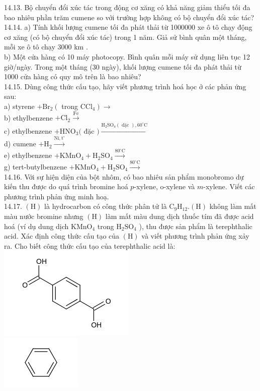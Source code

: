 \documentclass[10pt]{article}
\begin{document}
14.13. Bộ chuyển đổi xúc tác trong động cơ xăng có khả năng giảm thiểu tối đa bao nhiêu phần trăm cumene so với trường hợp không có bộ chuyển đổi xúc tác?\\
14.14. a) Tính khối lượng cumene tối đa phát thải từ 1000000 xe ô tô chạy động cơ xăng (có bộ chuyển đổi xúc tác) trong 1 năm. Giả sử bình quân một tháng, mỗi xe ô tô chạy 3000 km .\\
b) Một cửa hàng có 10 máy photocopy. Bình quân mỗi máy sử dụng liên tục 12 giờ/ngày. Trong một tháng (30 ngày), khối lượng cumene tối đa phát thải từ 1000 cửa hàng có quy mô trên là bao nhiêu?\\
14.15. Dùng công thức cấu tạo, hãy viết phương trình hoá học ở các phản ứng sau:\\
a) styrene $+\mathrm{Br}_{2}\left(\right.$ trong $\left.\mathrm{CCl}_{4}\right) \longrightarrow$\\
b) ethylbenzene $+\mathrm{Cl}_{2} \xrightarrow{\mathrm{Fe}}$\\
c) ethylbenzene $+\mathrm{HNO}_{3}($ đặc $) \xrightarrow{\mathrm{H}_{2} \mathrm{SO}_{4}(\text { dặc }), 60^{\circ} \mathrm{C}}$\\
d) cumene $+\mathrm{H}_{2} \xrightarrow{\mathrm{Ni}, \mathrm{t}^{\circ}}$\\
e) ethylbenzene $+\mathrm{KMnO}_{4}+\mathrm{H}_{2} \mathrm{SO}_{4} \xrightarrow{80^{\circ} \mathrm{C}}$\\
g) tert-butylbenzene $+\mathrm{KMnO}_{4}+\mathrm{H}_{2} \mathrm{SO}_{4} \xrightarrow{80^{\circ} \mathrm{C}}$\\
14.16. Với sự hiện diện của bột nhôm, có bao nhiêu sản phẩm monobromo dự kiến thu được do quá trình bromine hoá $p$-xylene, o-xylene và $m$-xylene. Viết các phương trình phản ứng minh hoạ.\\
14.17. $(\mathrm{H})$ là hydrocarbon có công thức phân tử là $\mathrm{C}_{9} \mathrm{H}_{12} .(\mathrm{H})$ không làm mất màu nước bromine nhưng $(\mathrm{H})$ làm mất màu dung dịch thuốc tím đã được acid hoá (ví dụ dung dịch $\mathrm{KMnO}_{4}$ trong $\mathrm{H}_{2} \mathrm{SO}_{4}$ ), thu được sản phẩm là terephthalic acid. Xác định công thức cấu tạo của $(\mathrm{H})$ và viết phương trình phản ứng xảy ra. Cho biết công thức cấu tạo của terephthalic acid là:\\
\includegraphics{smile-c61b6bfc2ee8509c73527a65d04f20529e06f3b2}\\
\includegraphics{smile-ddf79f13631d80950f2152839f64ab3ba881c9e5}
\end{document}
